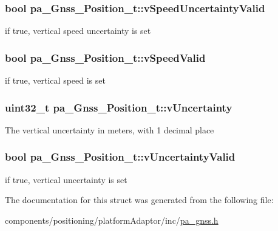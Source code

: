 \subsubsection[{\texorpdfstring{v\+Speed\+Uncertainty\+Valid}{vSpeedUncertaintyValid}}]{\setlength{\rightskip}{0pt plus 5cm}bool pa\+\_\+\+Gnss\+\_\+\+Position\+\_\+t\+::v\+Speed\+Uncertainty\+Valid}\hypertarget{structpa___gnss___position__t_acdc3d05933522d411f1dd89c74bbaa86}{}\label{structpa___gnss___position__t_acdc3d05933522d411f1dd89c74bbaa86}


if true, vertical speed uncertainty is set 

\subsubsection[{\texorpdfstring{v\+Speed\+Valid}{vSpeedValid}}]{\setlength{\rightskip}{0pt plus 5cm}bool pa\+\_\+\+Gnss\+\_\+\+Position\+\_\+t\+::v\+Speed\+Valid}\hypertarget{structpa___gnss___position__t_aef1c76ec888172dd9ca8aa95147452af}{}\label{structpa___gnss___position__t_aef1c76ec888172dd9ca8aa95147452af}


if true, vertical speed is set 

\subsubsection[{\texorpdfstring{v\+Uncertainty}{vUncertainty}}]{\setlength{\rightskip}{0pt plus 5cm}uint32\+\_\+t pa\+\_\+\+Gnss\+\_\+\+Position\+\_\+t\+::v\+Uncertainty}\hypertarget{structpa___gnss___position__t_a4d362f10e240732d4cfab4603d590ca6}{}\label{structpa___gnss___position__t_a4d362f10e240732d4cfab4603d590ca6}
The vertical uncertainty in meters, with 1 decimal place 
\subsubsection[{\texorpdfstring{v\+Uncertainty\+Valid}{vUncertaintyValid}}]{\setlength{\rightskip}{0pt plus 5cm}bool pa\+\_\+\+Gnss\+\_\+\+Position\+\_\+t\+::v\+Uncertainty\+Valid}\hypertarget{structpa___gnss___position__t_af255c1cb921b90bc9b3e4ed8379010cb}{}\label{structpa___gnss___position__t_af255c1cb921b90bc9b3e4ed8379010cb}


if true, vertical uncertainty is set 



The documentation for this struct was generated from the following file\+:\begin{DoxyCompactItemize}
\item 
components/positioning/platform\+Adaptor/inc/\hyperlink{pa__gnss_8h}{pa\+\_\+gnss.\+h}\end{DoxyCompactItemize}

